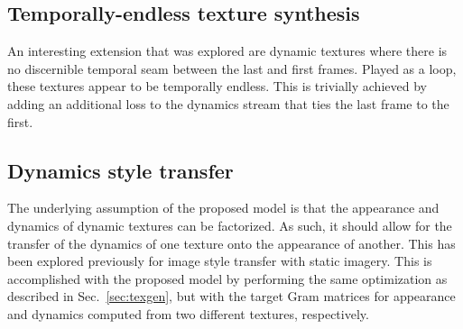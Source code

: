 

\subsection{Temporally-endless texture synthesis}\label{sec:temporally_endless_synthesis}

An interesting extension that was explored are dynamic textures where there is no discernible temporal seam between the last and first frames. Played as a loop, these textures appear to be temporally endless. This is trivially achieved by adding an additional loss to the dynamics stream that ties the last frame to the first. 

\subsection{Dynamics style transfer}

The underlying assumption of the proposed model is that the appearance
and dynamics of dynamic textures can be factorized.
As such, it should allow for the transfer of the dynamics of
one texture onto the appearance of another.
This has been explored previously for image style transfer
\cite{champandard2016,gatys2017} with static imagery.
This is accomplished with the proposed model by performing the same 
optimization as described in Sec.\ \ref{sec:texgen}, but with the target Gram matrices for 
appearance and dynamics computed from two different textures, respectively. 